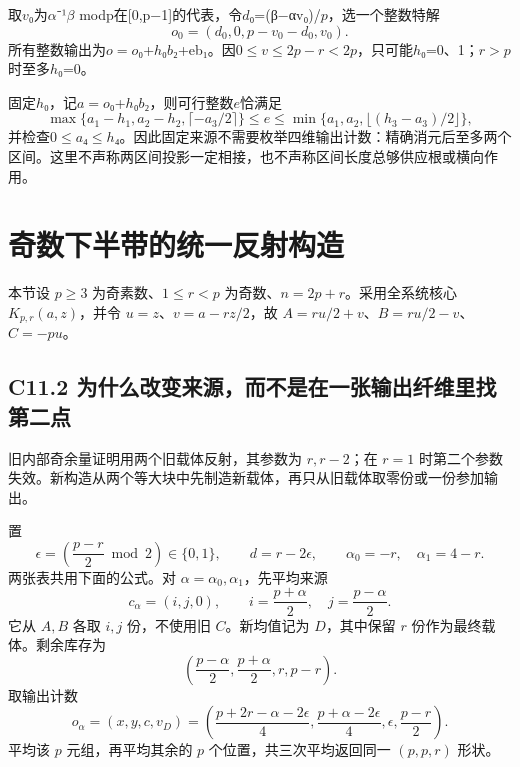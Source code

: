 \documentclass[11pt,a4paper]{article}
\theoremstyle{definition}
\numberwithin{equation}{section}
\begin{document}
{取\ensuremath{v}₀为\ensuremath{\alpha }⁻¹\ensuremath{\beta }} {modp在{[}0,p−1{]}的代表，令\ensuremath{d}₀=(β−αv₀)/\ensuremath{p}，选一个整数特解} \[
o_0=(d_0,0,p-v_0-d_0,v_0).
\] {所有整数输出为\ensuremath{o=o}₀+\ensuremath{h}₀\ensuremath{b}₂+eb₁。因0\ensuremath{\le}\ensuremath{v}\ensuremath{\le}\ensuremath{2p-r<2p}，只可能\ensuremath{h}₀=0、1；\ensuremath{r>p}时至多\ensuremath{h}₀=0。}

{固定\ensuremath{h}₀，记\ensuremath{a=o}₀+\ensuremath{h}₀\ensuremath{b}₂，则可行整数\ensuremath{e}恰满足} \[
\max\{a_1-h_1,a_2-h_2,\lceil-a_3/2\rceil\}
\le e\le
\min\{a_1,a_2,\lfloor(h_3-a_3)/2\rfloor\},
\tag{C10.3.9}
\] {并检查0\ensuremath{\le}\ensuremath{a}₄\ensuremath{\le}\ensuremath{h}₄。因此固定来源不需要枚举四维输出计数：精确消元后至多两个区间。这里不声称两区间投影一定相接，也不声称区间长度总够供应根或横向作用。}


\section{奇数下半带的统一反射构造}\label{construct:odd-pencil}
{本节设} \(p\ge3\) {为奇素数、}\(1\le r<p\) {为奇数、}\(n=2p+r\){。采用全系统核心} \(K_{p,r}(a,z)\){，并令} \(u=z\){、}\(v=a-rz/2\){，故} \(A=ru/2+v\){、}\(B=ru/2-v\){、}\(C=-pu\){。}

\subsection*{\texorpdfstring{{C11.2} {为什么改变来源，而不是在一张输出纤维里找第二点}}{C11.2 为什么改变来源，而不是在一张输出纤维里找第二点}}\label{C11-h78}

{旧内部奇余量证明用两个旧载体反射，其参数为} \(r,r-2\){；在} \(r=1\) {时第二个参数失效。新构造从两个等大块中先制造新载体，再只从旧载体取零份或一份参加输出。}

{置} \[
\epsilon=\left(\frac{p-r}{2}\bmod2\right)\in\{0,1\},\qquad
d=r-2\epsilon,\qquad
\alpha_0=-r,\quad \alpha_1=4-r.
\tag{C11.2.1}
\] {两张表共用下面的公式。对} \(\alpha=\alpha_0,\alpha_1\){，先平均来源} \[
c_\alpha=(i,j,0),\qquad
i=\frac{p+\alpha}{2},\quad j=\frac{p-\alpha}{2}.
\tag{C11.2.2}
\] {它从} \(A,B\) {各取} \(i,j\) {份，不使用旧} \(C\){。新均值记为} \(D\){，其中保留} \(r\) {份作为最终载体。剩余库存为} \[
\left(\frac{p-\alpha}{2},\frac{p+\alpha}{2},r,p-r\right).
\tag{C11.2.3}
\] {取输出计数} \[
o_\alpha=(x,y,c,v_D)=
\left(
\frac{p+2r-\alpha-2\epsilon}{4},
\frac{p+\alpha-2\epsilon}{4},
\epsilon,
\frac{p-r}{2}
\right).
\tag{C11.2.4}
\] {平均该} \(p\) {元组，再平均其余的} \(p\) {个位置，共三次平均返回同一} \((p,p,r)\) {形状。}
\end{document}
